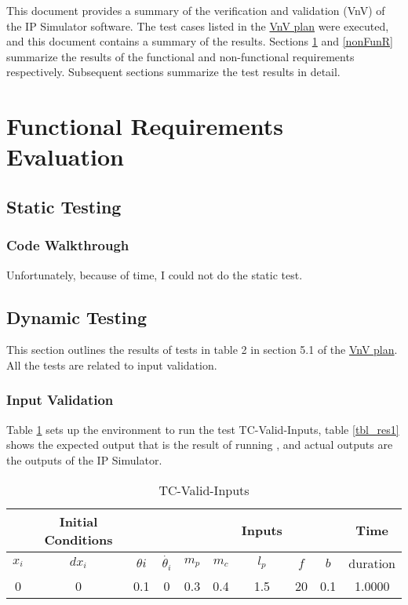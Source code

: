 \documentclass[12pt, titlepage]{article}
\begin{document}
\listoftables %

\listoffigures %

\newpage


This document provides a summary of the verification and validation
(VnV) of the IP Simulator software. The test cases listed in the \href{https://github.com/MinMah23/CAS741-Project/tree/main/docs/VnVPlan}{VnV plan} were executed, and this document contains a summary of the results. Sections \ref{FunR} and \ref{nonFunR} summarize the results of the functional and non-functional requirements respectively. Subsequent sections summarize the test results in detail.

\section{Functional Requirements Evaluation}\label{FunR}
\subsection{Static Testing}
\subsubsection{Code Walkthrough}
Unfortunately, because of time, I could not do the static test.\\
\subsection{Dynamic Testing}
This section outlines the results of tests in table 2 in section 5.1 of the \href{https://github.com/MinMah23/CAS741-Project/tree/main/docs/VnVPlan}{VnV plan}. All the tests are related to input validation.\\
\subsubsection{Input Validation}
Table \ref{tbl_tc1} sets up the environment to run the test TC-Valid-Inputs, table \ref{tbl_res1} shows the expected output that is the result of running \cite{al-khazraji_2022}, and actual outputs are the outputs of the IP Simulator.\\
\begin{table}[ht]
\caption{TC-Valid-Inputs} \label{tbl_tc1}
\vspace*{2mm}
\centering
 \begin{tabular}{|c c c c|c c c c c|c|} 
 \hline
&\textbf{Initial Conditions}&& &  &  &  \textbf{Inputs} &  &&\textbf{Time}  \\ \hline
$x_i$&$dx_i$&$\theta{i}$&$\dot{\theta_{i}}$ & $m_p$ & $m_c$ & $l_p$ & $f$ & $b$  & duration \\ \hline
0 & 0 & 0.1 & 0 &0.3 & 0.4& 1.5& 20& 0.1 &1.0000\\
 \hline
\end{tabular}
\end{table}	
  
\end{document}
